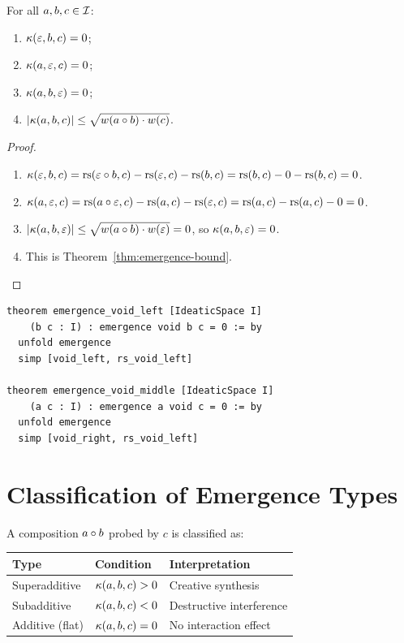 \begin{proposition}
\label{prop:emergence-basic}
For all $a, b, c \in \mathcal{I}$:
\begin{enumerate}
    \item $\kappa(\varepsilon, b, c) = 0$;
    \item $\kappa(a, \varepsilon, c) = 0$;
    \item $\kappa(a, b, \varepsilon) = 0$;
    \item $|\kappa(a, b, c)| \leq \sqrt{w(a \circ b) \cdot w(c)}$.
\end{enumerate}
\end{proposition}
\begin{proof}
\begin{enumerate}
    \item $\kappa(\varepsilon, b, c) = \mathrm{rs}(\varepsilon \circ b, c) - \mathrm{rs}(\varepsilon, c)
          - \mathrm{rs}(b, c) = \mathrm{rs}(b, c) - 0 - \mathrm{rs}(b, c) = 0$.
    \item $\kappa(a, \varepsilon, c) = \mathrm{rs}(a \circ \varepsilon, c) - \mathrm{rs}(a, c)
          - \mathrm{rs}(\varepsilon, c) = \mathrm{rs}(a, c) - \mathrm{rs}(a, c) - 0 = 0$.
    \item $|\kappa(a, b, \varepsilon)| \leq \sqrt{w(a \circ b) \cdot w(\varepsilon)}
          = 0$, so $\kappa(a, b, \varepsilon) = 0$.
    \item This is Theorem~\ref{thm:emergence-bound}.
\end{enumerate}
\end{proof}

\begin{lstlisting}[language=Lean4, caption={Emergence vanishing at void}]
theorem emergence_void_left [IdeaticSpace I]
    (b c : I) : emergence void b c = 0 := by
  unfold emergence
  simp [void_left, rs_void_left]

theorem emergence_void_middle [IdeaticSpace I]
    (a c : I) : emergence a void c = 0 := by
  unfold emergence
  simp [void_right, rs_void_left]
\end{lstlisting}

\section{Classification of Emergence Types}

\begin{definition}\label{def:emergence-taxonomy}
A composition $a \circ b$ probed by $c$ is classified as:
\begin{center}
\begin{tabular}{lll}
\toprule
\textbf{Type} & \textbf{Condition} & \textbf{Interpretation} \\
\midrule
Superadditive & $\kappa(a,b,c) > 0$ & Creative synthesis \\
Subadditive & $\kappa(a,b,c) < 0$ & Destructive interference \\
Additive (flat) & $\kappa(a,b,c) = 0$ & No interaction effect \\
\bottomrule
\end{tabular}
\end{center}
\end{definition}

